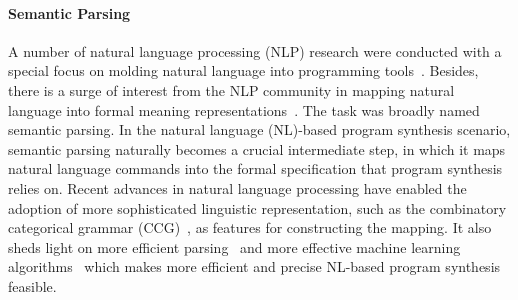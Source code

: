 \paragraph{Semantic Parsing} A number of natural language processing (NLP) research were conducted with a special focus on molding natural language into programming tools~\cite{mihalcea2006nlp,LandhauBer:2015:TUP:2820668.2820671}. Besides, 
there is a surge of interest from the NLP community in mapping natural language into formal meaning representations~\cite{Zettlemoyer05learningto,artzi2013weakly,DBLP:Poon13,Kwiatkowski:2011:LGC:2145432.2145593,liang2013learning}. The task was broadly named semantic parsing. In the natural language (NL)-based program synthesis scenario, semantic parsing naturally becomes a crucial intermediate step, in which it maps natural language commands into the formal specification that program synthesis relies on.  Recent advances in natural language processing have enabled the adoption of more sophisticated linguistic representation, such as the combinatory categorical grammar (CCG)~\cite{opac-b1080082}, as features for constructing the mapping. It also sheds light on more efficient parsing~\cite{lewis2015joint} and more effective machine learning algorithms~\cite{DBLP:journals/corr/ZarembaS14} which makes more efficient and precise NL-based program synthesis feasible.
